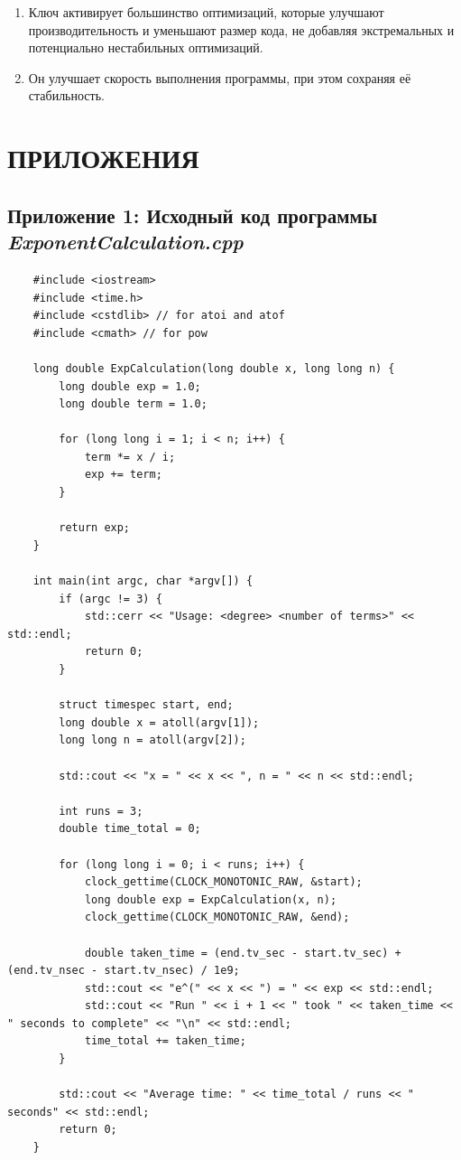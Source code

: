 \documentclass[12pt,a4paper]{article}
\numberwithin{subsection}{section}
\begin{document}
\begin{enumerate}
    \item Ключ активирует большинство оптимизаций, которые улучшают 
    производительность и уменьшают размер кода, не добавляя экстремальных
     и потенциально нестабильных оптимизаций.
    \item Он улучшает скорость выполнения программы, при этом сохраняя её стабильность.
\end{enumerate}
\newpage


\section{ПРИЛОЖЕНИЯ}\label{app:listing}

\subsection*{Приложение 1: Исходный код программы \textit{ExponentCalculation.cpp}}
\begin{lstlisting}
    #include <iostream>
    #include <time.h>
    #include <cstdlib> // for atoi and atof
    #include <cmath> // for pow
    
    long double ExpCalculation(long double x, long long n) {
        long double exp = 1.0;
        long double term = 1.0;
    
        for (long long i = 1; i < n; i++) {
            term *= x / i;
            exp += term;
        }
    
        return exp;
    }
    
    int main(int argc, char *argv[]) {
        if (argc != 3) {
            std::cerr << "Usage: <degree> <number of terms>" << std::endl;
            return 0;
        }
    
        struct timespec start, end;
        long double x = atoll(argv[1]);
        long long n = atoll(argv[2]);
    
        std::cout << "x = " << x << ", n = " << n << std::endl;
    
        int runs = 3;
        double time_total = 0;
    
        for (long long i = 0; i < runs; i++) {
            clock_gettime(CLOCK_MONOTONIC_RAW, &start);
            long double exp = ExpCalculation(x, n);
            clock_gettime(CLOCK_MONOTONIC_RAW, &end);
    
            double taken_time = (end.tv_sec - start.tv_sec) + (end.tv_nsec - start.tv_nsec) / 1e9;
            std::cout << "e^(" << x << ") = " << exp << std::endl;
            std::cout << "Run " << i + 1 << " took " << taken_time << " seconds to complete" << "\n" << std::endl;
            time_total += taken_time;
        }
    
        std::cout << "Average time: " << time_total / runs << " seconds" << std::endl;
        return 0;
    }
        
\end{lstlisting}
\end{document}
